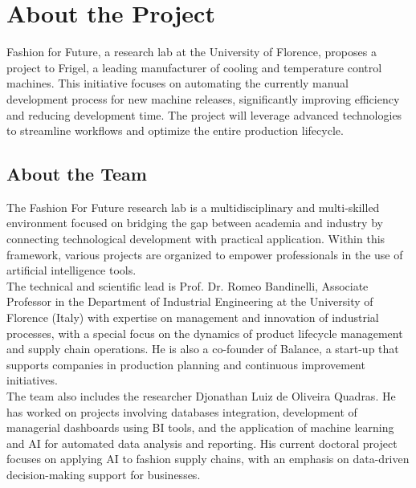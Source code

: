 \documentclass{article}%
\begin{document}
\section{About the Project}%
\label{sec:AbouttheProject}%
Fashion for Future, a research lab at the University of Florence, proposes a project to Frigel, a leading manufacturer of cooling and temperature control machines.  This initiative focuses on automating the currently manual development process for new machine releases, significantly improving efficiency and reducing development time.  The project will leverage advanced technologies to streamline workflows and optimize the entire production lifecycle.

%
\subsection{About the Team}%
\label{subsec:AbouttheTeam}%
The Fashion For Future research lab is a multidisciplinary and multi-skilled environment focused on bridging the gap between academia and industry by connecting technological development with practical application. Within this framework, various projects are organized to empower professionals in the use of artificial intelligence tools.  \\ 
The technical and scientific lead is Prof. Dr. Romeo Bandinelli, Associate Professor in the Department of Industrial Engineering at the University of Florence (Italy) with expertise on management and innovation of industrial processes, with a special focus on the dynamics of product lifecycle management and supply chain operations. He is also a co-founder of Balance, a start-up that supports companies in production planning and continuous improvement initiatives. \\ 
The team also includes the researcher Djonathan Luiz de Oliveira Quadras. He has worked on projects involving databases integration, development of managerial dashboards using BI tools, and the application of machine learning and AI for automated data analysis and reporting. His current doctoral project focuses on applying AI to fashion supply chains, with an emphasis on data-driven decision-making support for businesses. \\ 

%
\newpage%
\end{document}
